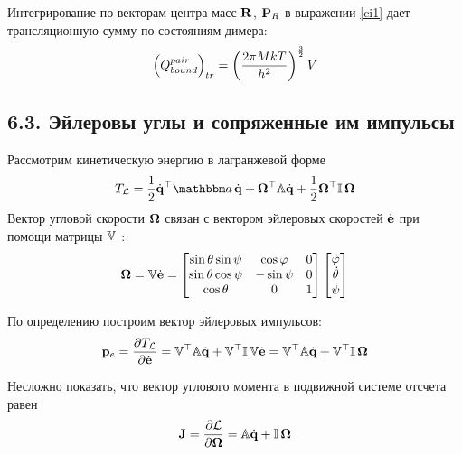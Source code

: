Интегрирование по векторам центра масс $\mathbf{R}$, $\mathbf{P}_R$ в выражении \eqref{ci1} дает трансляционную сумму по состояниям димера:
\vverh
\begin{gather}
	\left( Q_{bound}^{pair} \right)_{tr} = \left( \frac{2 \pi M k T}{h^2} \right)^{\frac{3}{2}} V \notag
\end{gather}

\subsection*{\textbf{6.3.} Эйлеровы углы и сопряженные им импульсы}

Рассмотрим кинетическую энергию в лагранжевой форме
\vverh
\begin{gather}
	T_\mL = \frac{1}{2} \dot{\mf{q}}^\top \bba \, \dot{\mf{q}} + \mf{\Omega}^\top \bbA \dot{\mf{q}} + \frac{1}{2} \mf{\Omega}^\top \bbI \, \mf{\Omega} \notag
\end{gather}
Вектор угловой скорости $\mathbf{\Omega}$ связан с вектором эйлеровых скоростей $\dot{\mathbf{e}}$ при помощи матрицы $\mathbb{V}$ \cite{goldstein}:
\begin{gather}
\mathbf{\Omega} = \mathbb{V} \dot{\mathbf{e}} = 
\begin{bmatrix}
\sin \theta \sin \psi & \cos \varphi & 0 \\
\sin \theta \cos \psi & - \sin \psi & 0 \\
\cos \theta & 0 & 1
\end{bmatrix}
\begin{bmatrix}
\dot{\varphi} \\
\dot{\theta} \\
\dot{\psi}
\end{bmatrix} \notag 
\end{gather}

По определению построим вектор эйлеровых импульсов:
\vverh
\begin{gather}
	\mathbf{p}_e = \frac{\partial T_{\mathcal{L}}}{\partial \dot{\mathbf{e}}} = \mathbb{V}^\top \mathbb{A} \dot{\mathbf{q}} + \mathbb{V}^\top \mathbb{I} \, \mathbb{V} \dot{\mathbf{e}} = \mathbb{V}^\top \mathbb{A} \dot{\mathbf{q}} + \mathbb{V}^\top \mathbb{I} \, \mathbf{\Omega} \notag
\end{gather}

Несложно показать, что вектор углового момента в подвижной системе отсчета равен
\vverh
\begin{gather}
	\mathbf{J} = \frac{\partial \mathcal{L}}{\partial \mathbf{\Omega}} = \mathbb{A} \dot{\mathbf{q}} + \mathbb{I} \, \mathbf{\Omega} \notag
\end{gather}


